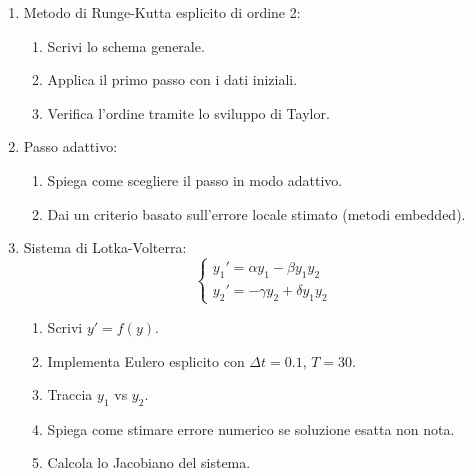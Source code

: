 \documentclass[12pt,a4paper]{article}
\begin{document}
{\begin{minipage}{\textwidth}
\begin{enumerate}
  \item Metodo di Runge-Kutta esplicito di ordine 2:
  \begin{enumerate}
    \item Scrivi lo schema generale.
    \item Applica il primo passo con i dati iniziali.
    \item Verifica l’ordine tramite lo sviluppo di Taylor.
  \end{enumerate}
  
  \item Passo adattivo:
  \begin{enumerate}
    \item Spiega come scegliere il passo in modo adattivo.
    \item Dai un criterio basato sull’errore locale stimato (metodi embedded).
  \end{enumerate}
  
  \item Sistema di Lotka-Volterra:
  \[
  \begin{cases}
  y_1' = \alpha y_1 - \beta y_1 y_2 \\
  y_2' = -\gamma y_2 + \delta y_1 y_2
  \end{cases}
  \]
  \begin{enumerate}
    \item Scrivi \( y' = f(y) \).
    \item Implementa Eulero esplicito con \(\Delta t=0.1\), \(T=30\).
    \item Traccia \( y_1 \) vs \( y_2 \).
    \item Spiega come stimare errore numerico se soluzione esatta non nota.
    \item Calcola lo Jacobiano del sistema.
  \end{enumerate}
\end{enumerate}
\end{minipage}%
}

\vspace{1em}
\noindent
\end{document}
